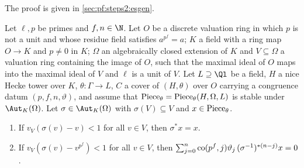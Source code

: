 The proof is given in \cref{sec:pf:steps2:esgen}.

\begin{proposition}\label{prop:pf:steps2:towes}
Let $\ell,p$ be primes and $f,n\in\N$. Let $O$ be a discrete valuation ring in which $p$ is not a
unit and whose residue field satisfies $a^{p^f}=a$; $K$ a field with a ring map $O\to K$ and $p\ne0$
in $K$; $\Omega$ an algebraically closed extension of $K$ and $V\subseteq\Omega$ a valuation ring
containing the image of $O$, such that the maximal ideal of $O$ maps into the maximal ideal of $V$
and $\ell$ is a unit of $V$. Let $L\supseteq\Ql$ be a field, $H$ a nice Hecke tower over $K$,
$\theta\colon\Gamma\to L$, $C$ a cover of $(H,\theta)$ over $O$ carrying a congruence datum
$(p,f,n,\vartheta)$, and assume that $\mathrm{Piece}_\theta=\mathrm{Piece}_\theta(H,\Omega,L)$ is stable
under $\Aut_K(\Omega)$. Let $\sigma\in\Aut_K(\Omega)$ with $\sigma(V)\subseteq V$ and
$x\in\mathrm{Piece}_\theta$.
\begin{enumerate}[label=\textup{(\alph*)},nosep]
\item If $v_V(\sigma(v)-v)<1$ for all $v\in V$, then $\sigma^\ast x=x$.
\item If $v_V(\sigma(v)-v^{p^f})<1$ for all $v\in V$, then
  $\sum_{j=0}^n\mathrm{co}(p^f,j)\vartheta_j\,(\sigma^{-1})^{\ast(n-j)}x=0$.
\end{enumerate}
\end{proposition}

